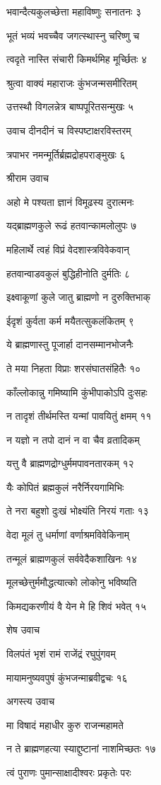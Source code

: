 भवान्दैत्यकुलच्छेत्ता महाविष्णुः सनातनः ३

भूतं भव्यं भवच्चैव जगत्स्थास्नु चरिष्णु च

त्वदृते नास्ति संचारी किमर्थमिह मूर्च्छितः ४

श्रुत्वा वाक्यं महाराजः कुंभजन्मसमीरितम्

उत्तस्थौ विगलन्नेत्र बाष्पपूरितसन्मुखः ५

उवाच दीनदीनं च विस्पष्टाक्षरविस्तरम्

त्रपाभर नमन्मूर्तिर्ब्रह्मद्रोहपराङ्मुखः ६

श्रीराम उवाच

अहो मे पश्यता ज्ञानं विमूढस्य दुरात्मनः

यद्ब्राह्मणकुले रूढं हतवान्कामलोलुपः ७

महिलार्थे त्वहं विप्रं वेदशास्त्रविवेकवान्

हतवान्वाडवकुलं बुद्धिहीनोति दुर्मतिः ८

इक्ष्वाकूणां कुले जातु ब्राह्मणो न दुरुक्तिभाक्

ईदृशं कुर्वता कर्म मयैतत्सुकलंकितम् ९

ये ब्राह्मणास्तु पूजार्हा दानसम्मानभोजनैः

ते मया निहता विप्राः शरसंघातसंहितैः १०

काँल्लोकान्नु गमिष्यामि कुंभीपाकोऽपि दुःसहः

न तादृशं तीर्थमस्ति यन्मां पावयितुं क्षमम् ११

न यज्ञो न तपो दानं न वा चैव व्रतादिकम्

यत्तु वै ब्राह्मणद्रोग्धुर्ममपावनतारकम् १२

यैः कोपितं ब्रह्मकुलं नरैर्निरयगामिभिः

ते नरा बहुशो दुःखं भोक्ष्यंति निरयं गताः १३

वेदा मूलं तु धर्माणां वर्णाश्रमविवेकिनाम्

तन्मूलं ब्राह्मणकुलं सर्ववेदैकशाखिनः १४

मूलच्छेत्तुर्ममौद्धत्यात्को लोकोनु भविष्यति

किमद्यकरणीयं वै येन मे हि शिवं भवेत् १५

शेष उवाच

विलपंतं भृशं रामं राजेंद्रं रघुपुंगवम्

मायामनुष्यवपुषं कुंभजन्माब्रवीद्वचः १६

अगस्त्य उवाच

मा विषादं महाधीर कुरु राजन्महामते

न ते ब्राह्मणहत्या स्याद्दुष्टानां नाशमिच्छतः १७

त्वं पुराणः पुमान्साक्षादीश्वरः प्रकृतेः परः

